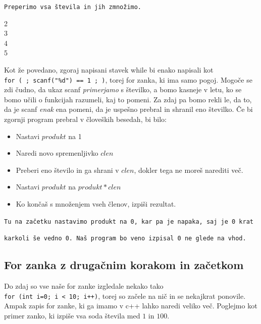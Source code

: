 \documentclass{book}
\begin{document}
\begin{examples}
\verb+Preperimo vsa števila in jih zmnožimo.+


\begin{inout}
	2  \\
	3 \\
	4 \\
	5
\end{inout}

\end{examples}

Kot že povedano, zgoraj napisani stavek while bi enako napisali kot
\texttt{for~(~;~scanf("\%d")~==~1~;~)}, torej for zanka, ki ima samo pogoj.
Mogoče se zdi čudno, da ukaz scanf \emph{primerjamo} s številko, a bomo kasneje
v letu, ko se bomo učili o funkcijah razumeli, kaj to pomeni. Za zdaj pa
bomo rekli le, da to, da je scanf \emph{enak} ena pomeni, da je uspešno prebral
in shranil eno številko. Če bi zgornji program prebral v človeških besedah, bi
bilo:
\begin{itemize}
	\item Nastavi $produkt$ na 1
	\item Naredi novo spremenljivko $clen$
	\item Preberi eno število in ga shrani v $clen$, dokler tega ne moreš
	narediti več.
	\item Nastavi $produkt$ na $produkt * clen$
	\item Ko končaš s množenjem vseh členov, izpiši rezultat.
\end{itemize}

\begin{errors}
\verb+Tu na začetku nastavimo produkt na 0, kar pa je napaka, saj je 0 krat+

\verb+karkoli še vedno 0. Naš program bo veno izpisal 0 ne glede na vhod.+


\end{errors}

\subsection{For zanka z drugačnim korakom in začetkom}

Do zdaj so vse naše for zanke izgledale nekako tako
\texttt{for~(int~i=0;~i~<~10;~i++)}, torej so začele na nič in se nekajkrat
ponovile. Ampak zapis for zanke, ki ga imamo v c++ lahko naredi veliko več.
Poglejmo kot primer zanko, ki izpiše vsa soda števila med $1$ in $100$.
\end{document}
